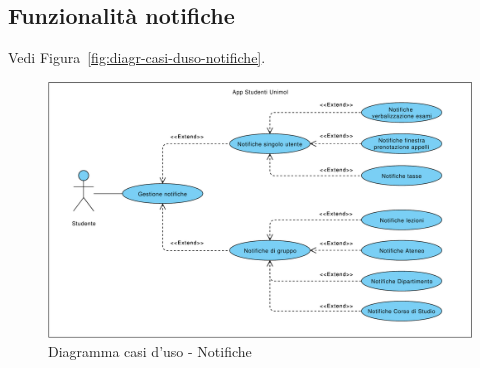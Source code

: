 \subsection{Funzionalità notifiche}

Vedi Figura~\vref{fig:diagr-casi-duso-notifiche}.

\begin{figure}
	\centering
	\includegraphics[width=\textwidth]{imgs/gruppo2/usecase-diagram-notifiche}
	\caption{Diagramma casi d'uso - Notifiche}
	\label{fig:diagr-casi-duso-notifiche}
\end{figure}

\clearpage